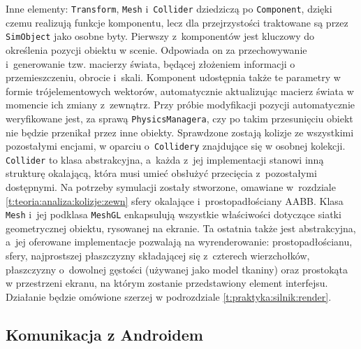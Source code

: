 		Inne elementy: \texttt{Transform}, \texttt{Mesh} i~\texttt{Collider} dziedziczą po \texttt{Component}, dzięki czemu realizują funkcje komponentu, lecz dla przejrzystości traktowane są przez \texttt{SimObject} jako osobne byty. Pierwszy z~komponentów jest kluczowy do określenia pozycji obiektu w scenie. Odpowiada on za przechowywanie i~generowanie tzw. macierzy świata, będącej złożeniem informacji o przemieszczeniu, obrocie i~skali. Komponent udostępnia także te parametry w formie trójelementowych wektorów, automatycznie aktualizując macierz świata w momencie ich zmiany z~zewnątrz. Przy próbie modyfikacji pozycji automatycznie weryfikowane jest, za sprawą \texttt{PhysicsManagera}, czy po takim przesunięciu obiekt nie będzie przenikał przez inne obiekty. Sprawdzone zostają kolizje ze wszystkimi pozostałymi encjami, w oparciu o~\texttt{Collidery} znajdujące się w osobnej kolekcji. \texttt{Collider} to klasa abstrakcyjna, a~każda z~jej implementacji stanowi inną strukturę okalającą, która musi umieć obsłużyć przecięcia z~pozostałymi dostępnymi. Na potrzeby symulacji zostały stworzone, omawiane w~rozdziale \ref{t:teoria:analiza:kolizje:zewn} sfery okalające i~prostopadłościany AABB. Klasa \texttt{Mesh} i~jej podklasa \texttt{MeshGL} enkapsulują wszystkie właściwości dotyczące siatki geometrycznej obiektu, rysowanej na ekranie. Ta ostatnia także jest abstrakcyjna, a~jej oferowane implementacje pozwalają na wyrenderowanie: prostopadłościanu, sfery, najprostszej płaszczyzny składającej się z~czterech wierzchołków, płaszczyzny o~dowolnej gęstości (używanej jako model tkaniny) oraz prostokąta w przestrzeni ekranu, na którym zostanie przedstawiony element interfejsu. Działanie będzie omówione szerzej w podrozdziale \ref{t:praktyka:silnik:render}.
		
		\subsection{Komunikacja z Androidem}
		\label{t:praktyka:silnik:andro}
		
		
